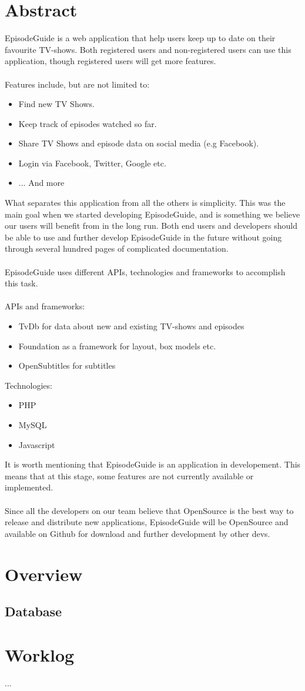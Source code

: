 \documentclass[12pt]{article}
\begin{document}


\tableofcontents

\section{Abstract}
EpisodeGuide is a web application that help users keep up to date on their favourite TV-shows. Both registered users and non-registered users can use this application, though registered users will get more features.
\\\\
Features include, but are not limited to:
\begin{itemize}
  \item Find new TV Shows.
  \item Keep track of episodes watched so far.
  \item Share TV Shows and episode data on social media (e.g Facebook).
  \item Login via Facebook, Twitter, Google etc.
  \item ... And more
\end{itemize}
What separates this application from all the others is simplicity. This was the main goal when we started developing EpisodeGuide, and is something we believe our users will benefit from in the long run.
Both end users and developers should be able to use and further develop EpisodeGuide in the future without going through several hundred pages of complicated documentation.
\\\\
EpisodeGuide uses different APIs, technologies and frameworks to accomplish this task.\\\\
APIs and frameworks:
\begin{itemize}
  \item TvDb for data about new and existing TV-shows and episodes
  \item Foundation as a framework for layout, box models etc.
  \item OpenSubtitles for subtitles
\end{itemize}
Technologies:
\begin{itemize}
  \item PHP
  \item MySQL
  \item Javascript
\end{itemize}
It is worth mentioning that EpisodeGuide is an application in developement. This means that at this stage, some features are not currently available or implemented.\\
\\
Since all the developers on our team believe that OpenSource is the best way to release and distribute new applications, EpisodeGuide will be OpenSource and available on Github for download and further development by other devs.
\section{Overview}
\subsection{Database}


\section{Worklog}


...
\end{document}
